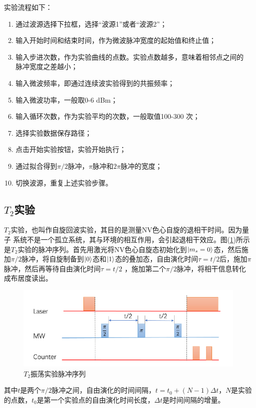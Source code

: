 \documentclass[a4paper]{article}
\begin{document}
实验流程如下：
\begin{enumerate}
	\item 通过波源选择下拉框，选择“波源1”或者“波源2”；
	\item 输入开始时间和结束时间，作为微波脉冲宽度的起始值和终止值；
	\item 输入步进次数，作为实验曲线的点数。实验点数越多，意味着相邻点之间的
	脉冲宽度之差越小；
	\item 输入微波频率，即通过连续波实验得到的共振频率；
	\item 输入微波功率，一般取0-6 dBm；
	\item 输入循环次数，作为实验平均的次数，一般取值100-300 次；
	\item  选择实验数据保存路径；
	\item  点击开始实验按钮，实验开始执行；
	\item 通过拟合得到$ \pi/2 $脉冲，$ \pi $脉冲和$ 2\pi $脉冲的宽度；
	\item 切换波源，重复上述实验步骤。
\end{enumerate}


\subsection{$ T_2 $实验}
$ T_2  $实验，也叫作自旋回波实验，其目的是测量NV色心自旋的退相干时间。因为量子
系统不是一个孤立系统，其与环境的相互作用，会引起退相干效应。图(\ref{fig:t2})所示是$ T_2 $实验的脉冲序列。首先用激光将NV色心自旋态初始化到$ \ket{m_s=0} $态，然后施加$ \pi/2 $脉冲，将自旋制备到$ \ket{0} $态和$ \ket{1} $态的叠加态，自由演化时间$ \tau = t/2 $后，施加$ \pi  $脉冲，然后再等待自由演化时间$\tau = t/2 $
，施加第二个$ \pi/2 $脉冲，将相干信息转化成布居度读出。
\begin{figure}[H]
	\centering
	\includegraphics[width=0.8\linewidth]{fig/t2.jpg}
	\caption{$ T_2 $振荡实验脉冲序列}
	\label{fig:t2}
\end{figure}
其中$ t  $是两个$ \pi/2 $脉冲之间，自由演化的时间间隔，$ t = t_0 + (N - 1)\Delta t $，$ N  $是实验的点数，$ t_0  $是第一个实验点的自由演化时间长度，$ \Delta t $是时间间隔的增量。
\end{document}
